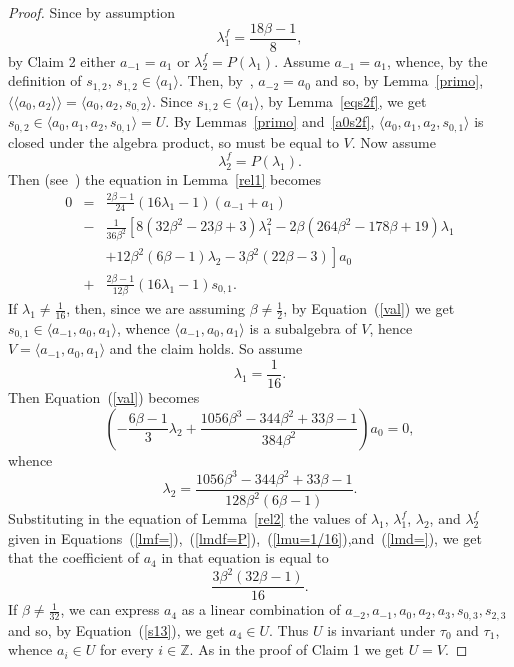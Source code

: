 \documentclass[a4paper]{amsart}
\newcommand{\Z}{{\mathbb Z}}
\newcommand{\lmu}{\lambda_1}
\newcommand{\lmf}{\lambda_1^f}
\newcommand{\lmd}{\lambda_2}
\newcommand{\lmdf}{\lambda_2^f}
\newcommand{\bt}{\beta}
\begin{document}
\begin{proof}
Since by assumption
\begin{equation}\label{lmf=}
\lmf=\frac{18\bt-1}{8},
\end{equation}
 by Claim 2 either $a_{-1}=a_1$ or $\lmdf=P(\lmu)$. Assume $a_{-1}=a_1$, whence, by the definition of $s_{1,2}$,  $s_{1,2}\in \langle a_1\rangle$. Then, by~\cite[Theorem~1.1]{axet}, $a_{-2}=a_0$ and so, by Lemma~\ref{primo}, $\langle\langle a_{0}, a_2\rangle \rangle=\langle a_{0}, a_2, s_{0,2}\rangle$. Since $s_{1,2}\in \langle a_1\rangle$,  by Lemma~\ref{eqs2f}, we get $s_{0,2}\in \langle a_{0}, a_1, a_{2}, s_{0,1}\rangle=U$. By Lemmas~\ref{primo} and~\ref{a0s2f}, $\langle a_{0}, a_1, a_{2}, s_{0,1}\rangle$ is closed under the algebra product, so must be equal to $V$.
Now assume 
\begin{equation}\label{lmdf=P}
\lmdf=P(\lmu).
\end{equation}
 Then (see~\cite[genericsakuma-4bt.s]{code}) the equation in Lemma~\ref{rel1} becomes
\begin{eqnarray}\label{val}
0&=&
\frac{2\bt-1}{24}\left (16\lmu-1\right )(a_{-1}+a_{1}) \nonumber \\
&-&\frac{1}{36\bt^2} \left [ 
8(32\bt^2-23\bt+3)\lmu^2-2\bt(264\bt^2-178\bt+19)\lmu \right .\\
&&\left .+12\bt^2(6\bt-1)\lmd-3\bt^2(22\bt-3) \right ] a_0 \nonumber \\
&+& \frac{2\bt-1}{12\bt}\left (16\lmu-1\right )s_{0,1}. \nonumber 
\end{eqnarray}
If $\lmu\neq \frac{1}{16}$, then, since we are assuming $\bt\neq \tfrac{1}{2}$, by Equation~(\ref{val}) we get $s_{0,1}\in \langle a_{-1}, a_0, a_1\rangle$, whence $ \langle a_{-1}, a_0, a_1\rangle$ is a subalgebra of $V$, hence $V=\langle a_{-1}, a_0, a_1\rangle$ and the claim holds. So assume  
\begin{equation}\label{lmu=1/16}
\lmu= \frac{1}{16}.
\end{equation}
 Then Equation~(\ref{val}) becomes
$$
\left (-\frac{6\bt-1}{3}\lmd+\frac{1056\bt^3-344\bt^2+33\bt-1}{384\bt^2}\right )a_0=0, 
$$
whence
\begin{equation}\label{lmd=}
\lmd=\frac{1056\bt^3-344\bt^2+33\bt-1}{128\bt^2(6\bt-1)}.
\end{equation}
Substituting in the equation of Lemma~\ref{rel2} the values of $\lmu$, $\lmf$, $\lmd$, and $\lmdf$ given in Equations~(\ref{lmf=}),~(\ref{lmdf=P}),~(\ref{lmu=1/16}),and~(\ref{lmd=}), we get that the coefficient of $a_4$ in that equation is equal to 
$$
\frac{3\bt^2(32\bt-1)}{16}.
$$
If $\bt\neq \frac{1}{32}$, we can express $a_4$ as a linear combination of $a_{-2}, a_{-1}, a_0, a_2, a_3, s_{0,3}, s_{2,3}$ and so, by Equation~(\ref{s13}), we get $a_4\in U$. Thus $U$ is invariant under $\tau_0$ and $\tau_1$, whence $a_i\in U$ for every $i\in \Z$. As in the proof of Claim 1 we get $U=V$.


\end{proof}
\end{document}
